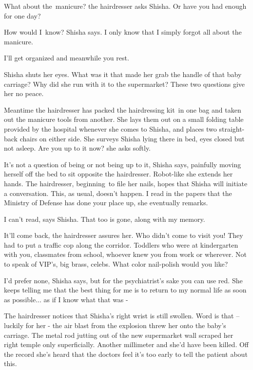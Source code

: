 \documentclass[letterpaper]{article}
\begin{document}
{\textquotedbl}What about the~manicure?{\textquotedbl} the hairdresser asks Shisha. {\textquotedbl}Or have you had
enough for one day?{\textquotedbl} 

{\textquotedbl}How would I~know?{\textquotedbl} Shisha says. {\textquotedbl}I only know that I simply forgot all about
the manicure.{\textquotedbl} 

{\textquotedbl}I'll get organized and meanwhile you rest.{\textquotedbl} 

Shisha shuts her eyes. What was it that made her grab the handle of that baby carriage? Why did she run with it to the
supermarket? These two questions give her no peace. 

Meantime the hairdresser has packed the hairdressing kit~in one bag and taken out the manicure tools from another. She
lays them out on a small folding table provided by the hospital whenever she comes to Shisha, and places two
straight-back chairs on either side. She surveys Shisha lying there in bed, eyes closed but not asleep.
{\textquotedbl}Are you up to it now?{\textquotedbl} she asks softly.

{\textquotedbl}It's not a question of being or not being up to it,{\textquotedbl} Shisha says, painfully{
}moving herself off the bed to sit opposite the hairdresser. Robot-like she extends her hands. The hairdresser,
beginning~to file her nails, hopes that Shisha will initiate a conversation. This, as usual, doesn't happen.
{\textquotedbl}I read in the papers that the Ministry of Defense has done your place up,{\textquotedbl} she eventually
remarks. 

{\textquotedbl}I can't read,{\textquotedbl} says Shisha. {\textquotedbl}That too is gone, along with my
memory.{\textquotedbl} 

{\textquotedbl}It'll come back,{\textquotedbl} the hairdresser assures her. {\textquotedbl}Who didn't come to visit you!
They had to put a traffic cop along the corridor. Toddlers who were at kindergarten with you, classmates from school,
whoever knew you from work or wherever. Not to speak of VIP's, big brass, celebs. What color nail-polish would you
like? {\textquotedbl} 

{\textquotedbl}I'd{ }prefer none,{\textquotedbl} Shisha says, {\textquotedbl}but
for the psychiatrist's sake you can use red. She keeps telling me that the best thing for me is to return to my normal
life as soon as possible... as if I know what that was -{\textquotedbl} ~

The hairdresser notices that Shisha's right wrist is still swollen. Word is that -- luckily for her - the air blast from
the explosion threw her onto the baby's carriage. The metal rod jutting out of the new supermarket wall scraped her
right temple only superficially. Another millimeter and she'd have been killed. Off the record she's heard that the
doctors feel it's too early to tell the patient about this.
\end{document}
